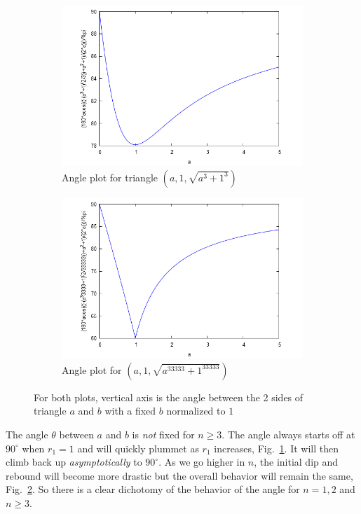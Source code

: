 \documentclass[aps,preprint,preprintnumbers,nofootinbib,showpacs,prd]{revtex4-1}
\begin{document}
\begin{figure}
\centering
\begin{subfigure}{.5\textwidth}
  \centering
  \includegraphics[width=1.1\linewidth]{FLT_angle_n_3.png}
  \caption{Angle plot for triangle $(a, 1, \sqrt{a^3 + 1^3})$}
  \label{fig:angle_n_3}
\end{subfigure}%
\begin{subfigure}{.5\textwidth}
  \centering
  \includegraphics[width=1.1\linewidth]{FLT_angle_n_33333.png}
  \caption{Angle plot for $(a, 1, \sqrt{a^{33333} + 1^{33333}})$}
  \label{fig:angle_n_33333}
\end{subfigure}
\caption{For both plots, vertical axis is the angle between the 2 sides of triangle $a$ and $b$ with a fixed $b$ normalized to $1$}
\label{fig:FLT_angle}
\end{figure}
%

The angle $\theta$ between $a$ and $b$ is {\it not} fixed for $n \ge 3$. The angle always starts off at $90^\circ$ when $r_1 = 1$ and will quickly plummet as $r_1$ increases, Fig.~\ref{fig:angle_n_3}. It will then climb back up {\it asymptotically} to $90^\circ$. As we go higher in $n$, the initial dip and rebound will become more drastic but the overall behavior will remain the same, Fig.~\ref{fig:angle_n_33333}. So there is a clear dichotomy of the behavior of the angle for $n=1,2$ and $n \ge 3$.
\end{document}
